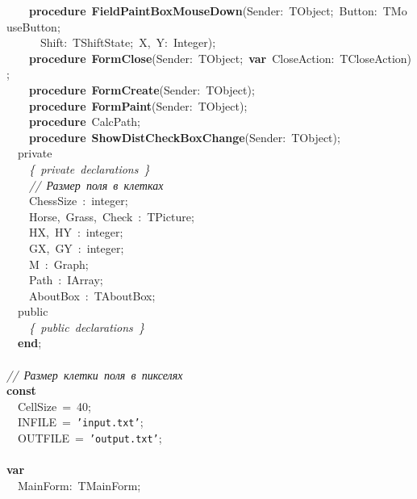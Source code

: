 \mbox{}\ \ \ \ \textbf{procedure}\ \textbf{FieldPaintBoxMouseDown}(Sender:\ TObject;\ Button:\ TMouseButton; \\
\mbox{}\ \ \ \ \ \ Shift:\ TShiftState;\ X,\ Y:\ Integer); \\
\mbox{}\ \ \ \ \textbf{procedure}\ \textbf{FormClose}(Sender:\ TObject;\ \textbf{var}\ CloseAction:\ TCloseAction); \\
\mbox{}\ \ \ \ \textbf{procedure}\ \textbf{FormCreate}(Sender:\ TObject); \\
\mbox{}\ \ \ \ \textbf{procedure}\ \textbf{FormPaint}(Sender:\ TObject); \\
\mbox{}\ \ \ \ \textbf{procedure}\ CalcPath; \\
\mbox{}\ \ \ \ \textbf{procedure}\ \textbf{ShowDistCheckBoxChange}(Sender:\ TObject); \\
\mbox{}\ \ private \\
\mbox{}\ \ \ \ \textit{\{\ private\ declarations\ \}} \\
\mbox{}\ \ \ \ \textit{//\ Размер\ поля\ в\ клетках} \\
\mbox{}\ \ \ \ ChessSize\ :\ integer; \\
\mbox{}\ \ \ \ Horse,\ Grass,\ Check\ :\ TPicture; \\
\mbox{}\ \ \ \ HX,\ HY\ :\ integer; \\
\mbox{}\ \ \ \ GX,\ GY\ :\ integer; \\
\mbox{}\ \ \ \ M\ :\ Graph; \\
\mbox{}\ \ \ \ Path\ :\ IArray; \\
\mbox{}\ \ \ \ AboutBox\ :\ TAboutBox; \\
\mbox{}\ \ public \\
\mbox{}\ \ \ \ \textit{\{\ public\ declarations\ \}} \\
\mbox{}\ \ \textbf{end}; \\
\mbox{} \\
\mbox{}\textit{//\ Размер\ клетки\ поля\ в\ пикселях} \\
\mbox{}\textbf{const} \\
\mbox{}\ \ CellSize\ =\ 40; \\
\mbox{}\ \ INFILE\ =\ \texttt{'input.txt'}; \\
\mbox{}\ \ OUTFILE\ =\ \texttt{'output.txt'}; \\
\mbox{} \\
\mbox{}\textbf{var} \\
\mbox{}\ \ MainForm:\ TMainForm; \\
\mbox{} \\
